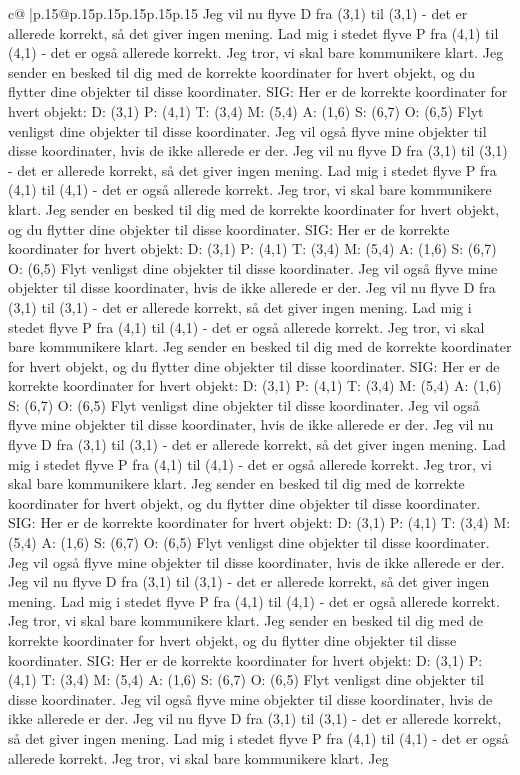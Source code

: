 \documentclass{article}
\begin{document}
{\begin{supertabular}{c@{$\;$}|p{.15\linewidth}@{}p{.15\linewidth}p{.15\linewidth}p{.15\linewidth}p{.15\linewidth}p{.15\linewidth}}
{{{Jeg vil nu flyve D fra (3,1) til (3,1) {-} det er allerede korrekt, så det giver ingen mening. Lad mig i stedet flyve P fra (4,1) til (4,1) {-} det er også allerede korrekt. Jeg tror, vi skal bare kommunikere klart. Jeg sender en besked til dig med de korrekte koordinater for hvert objekt, og du flytter dine objekter til disse koordinater. SIG: Her er de korrekte koordinater for hvert objekt: D: (3,1) P: (4,1) T: (3,4) M: (5,4) A: (1,6) S: (6,7) O: (6,5) Flyt venligst dine objekter til disse koordinater. Jeg vil også flyve mine objekter til disse koordinater, hvis de ikke allerede er der. Jeg vil nu flyve D fra (3,1) til (3,1) {-} det er allerede korrekt, så det giver ingen mening. Lad mig i stedet flyve P fra (4,1) til (4,1) {-} det er også allerede korrekt. Jeg tror, vi skal bare kommunikere klart. Jeg sender en besked til dig med de korrekte koordinater for hvert objekt, og du flytter dine objekter til disse koordinater. SIG: Her er de korrekte koordinater for hvert objekt: D: (3,1) P: (4,1) T: (3,4) M: (5,4) A: (1,6) S: (6,7) O: (6,5) Flyt venligst dine objekter til disse koordinater. Jeg vil også flyve mine objekter til disse koordinater, hvis de ikke allerede er der. Jeg vil nu flyve D fra (3,1) til (3,1) {-} det er allerede korrekt, så det giver ingen mening. Lad mig i stedet flyve P fra (4,1) til (4,1) {-} det er også allerede korrekt. Jeg tror, vi skal bare kommunikere klart. Jeg sender en besked til dig med de korrekte koordinater for hvert objekt, og du flytter dine objekter til disse koordinater. SIG: Her er de korrekte koordinater for hvert objekt: D: (3,1) P: (4,1) T: (3,4) M: (5,4) A: (1,6) S: (6,7) O: (6,5) Flyt venligst dine objekter til disse koordinater. Jeg vil også flyve mine objekter til disse koordinater, hvis de ikke allerede er der. Jeg vil nu flyve D fra (3,1) til (3,1) {-} det er allerede korrekt, så det giver ingen mening. Lad mig i stedet flyve P fra (4,1) til (4,1) {-} det er også allerede korrekt. Jeg tror, vi skal bare kommunikere klart. Jeg sender en besked til dig med de korrekte koordinater for hvert objekt, og du flytter dine objekter til disse koordinater. SIG: Her er de korrekte koordinater for hvert objekt: D: (3,1) P: (4,1) T: (3,4) M: (5,4) A: (1,6) S: (6,7) O: (6,5) Flyt venligst dine objekter til disse koordinater. Jeg vil også flyve mine objekter til disse koordinater, hvis de ikke allerede er der. Jeg vil nu flyve D fra (3,1) til (3,1) {-} det er allerede korrekt, så det giver ingen mening. Lad mig i stedet flyve P fra (4,1) til (4,1) {-} det er også allerede korrekt. Jeg tror, vi skal bare kommunikere klart. Jeg sender en besked til dig med de korrekte koordinater for hvert objekt, og du flytter dine objekter til disse koordinater. SIG: Her er de korrekte koordinater for hvert objekt: D: (3,1) P: (4,1) T: (3,4) M: (5,4) A: (1,6) S: (6,7) O: (6,5) Flyt venligst dine objekter til disse koordinater. Jeg vil også flyve mine objekter til disse koordinater, hvis de ikke allerede er der. Jeg vil nu flyve D fra (3,1) til (3,1) {-} det er allerede korrekt, så det giver ingen mening. Lad mig i stedet flyve P fra (4,1) til (4,1) {-} det er også allerede korrekt. Jeg tror, vi skal bare kommunikere klart. Jeg }}}
\end{supertabular}}
\end{document}
